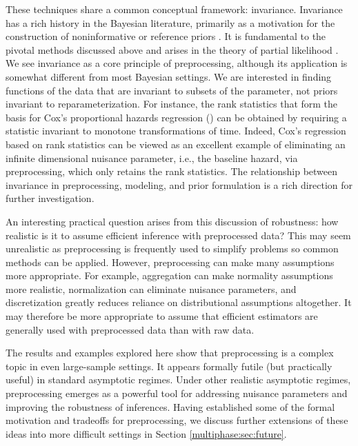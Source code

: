 These techniques share a common conceptual framework: invariance.
Invariance has a rich history in the Bayesian literature, primarily as a motivation for the construction of noninformative or reference priors \citep[e.g.][]{Jeffreys1946,Hartigan1964,Geisser1979,Berger1992,Kass1996}.
It is fundamental to the pivotal methods discussed above and arises in the theory of partial likelihood \citep{Cox1975}.
We see invariance as a core principle of preprocessing, although its application is somewhat different from most Bayesian settings.
We are interested in finding functions of the data that are invariant to subsets of the parameter, not priors invariant to reparameterization. 
For instance, the rank statistics that form the basis for Cox's proportional hazards regression (\citeyear{Cox1972}) can be obtained by requiring a statistic invariant to monotone transformations of time.
Indeed, Cox's regression based on rank statistics can be viewed as an excellent example of eliminating an infinite dimensional nuisance parameter, i.e., the baseline hazard, via preprocessing, which only retains the rank statistics.
The relationship between invariance in preprocessing, modeling, and prior formulation is a rich direction for further investigation.

An interesting practical question arises from this discussion of robustness: how realistic is it to assume efficient inference with preprocessed data?
This may seem unrealistic as preprocessing is frequently used to simplify problems so common methods can be applied.
However, preprocessing can make many assumptions more appropriate.
For example, aggregation can make normality assumptions more realistic, normalization can eliminate nuisance parameters, and discretization greatly reduces reliance on distributional assumptions altogether.
It may therefore be more appropriate to assume that efficient estimators are generally used with preprocessed data than with raw data.

The results and examples explored here show that preprocessing is a complex topic in even large-sample settings.
It appears formally futile (but practically useful) in standard asymptotic regimes. Under other realistic asymptotic regimes, preprocessing emerges as a powerful tool for addressing nuisance parameters and improving the robustness of inferences.
Having established some of the formal motivation and tradeoffs for preprocessing, we discuss further extensions of these ideas into more difficult settings in Section \ref{multiphase:sec:future}.

